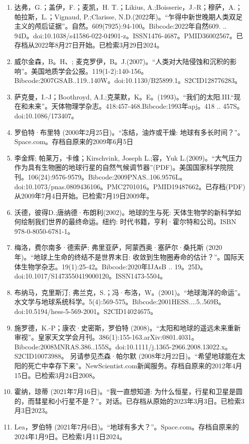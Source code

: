 \begin{enumerate}
\item 达弗，G.；盖伊，F.；麦凯，H. T.；Likius, A.;Boisserie，J.-R；穆萨，A.；帕拉斯，L.；Vignaud, P.;Clarisse, N.D.(2022年)。“乍得中新世晚期人类双足主义的颅后证据”。自然。609(7925):94-100。Bibcode:2022年自然609. .. 94D。doi:10.1038/s41586-022-04901-z。ISSN1476-4687。PMID36002567。已存档从2022年8月27日开始。已检索3月29日2024。  
\item 威尔金森，B。H、; 麦克罗伊，B。J.(2007)。“人类对大陆侵蚀和沉积的影响”。美国地质学会公报。119(1-2):140-156。Bibcode:2007GSAB..119..140W。doi:10.1130/B25899.1。S2CID128776283。 
\item 萨克曼，I.-J；Boothroyd, A.I.;克莱默，K。E。(1993)。“我们的太阳.III.“现在和未来”。天体物理学杂志。418:457-468.Bibcode:1993年apj。418 .. 457S。doi:10.1086/173407。
\item 罗伯特·布里特 (2000年2月25日)。“冻结，油炸或干燥: 地球有多长时间？”。Space.com。存档自原来的2009年6月5日
\item 李金辉; 帕莱万，卡维；Kirschvink, Joseph L.;容，Yuk L.(2009)。“大气压力作为具有生物圈的地球行星的自然气候调节器”(PDF)。美国国家科学院院刊。106(24):9576-9579。Bibcode:2009PNAS..106.9576L。doi:10.1073/pnas.0809436106。PMC2701016。PMID19487662。已存档(PDF)从2009年7月4日开始。已检索7月19日2009年。   
\item 沃德，彼得D.;唐纳德·布朗利(2002)。地球的生与死: 天体生物学的新科学如何绘制我们世界的最终命运。纽约: 时代书籍，亨利·霍尔特和公司。ISBN 978-0-8050-6781-1。
\item 梅洛，费尔南多·德索萨; 弗里亚萨，阿蒙西奥·塞萨尔·桑托斯 (2020年)。“地球上生命的终结不是世界末日: 收敛到生物圈寿命的估计？”。国际天体生物学杂志。19(1):25-42。Bibcode:2020年IJAsB .. 19。25D。doi:10.1017/S1473550419000120。ISSN1473-5504。 
\item 布纳马，克里斯汀; 弗兰克，S.；冯·布洛，W。(2001)。“地球海洋的命运”。水文学与地球系统科学。5(4):569-575。Bibcode:2001HESS....5..569B。doi:10.5194/hess-5-569-2001。S2CID14024675。 
\item 施罗德，K.-P；康农·史密斯，罗伯特 (2008)。“太阳和地球的遥远未来重新审视”。皇家天文学会月刊。386(1):155-163.arXiv:0801.4031。Bibcode:2008MNRAS.386..155S。doi:10.1111/j.1365-2966.2008.13022.x。S2CID10073988。 
另请参见杰森·帕尔默 (2008年2月22日)。“希望地球能在太阳的死亡中幸存下来”。NewScientist.com新闻服务。存档自原来的2012年4月15日。已检索3月24日2008。
\item 霍纳，琼蒂 (2021年7月16日)。“我一直想知道: 为什么恒星，行星和卫星是圆的，而彗星和小行星不是？”。对话。已存档从原始的2023年3月3日。已检索3月3日2023。
\item Lea，罗伯特 (2021年7月6日)。“地球有多大？”。Space.com。存档自原来的2024年1月9日。已检索1月11日2024。

\end{enumerate}
